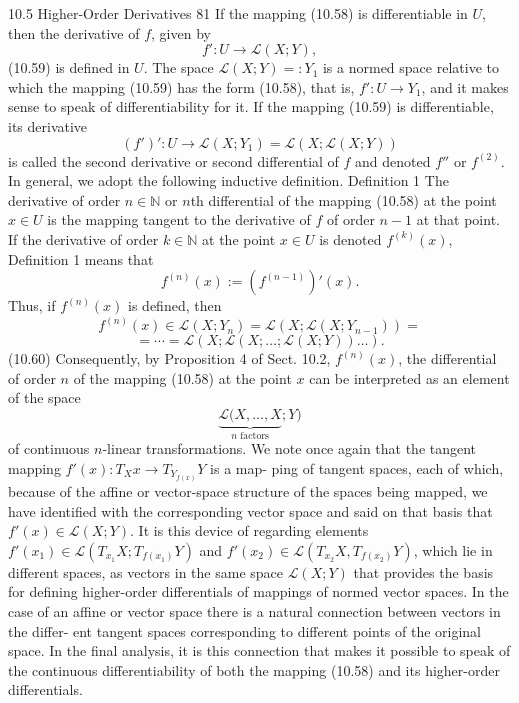 10.5 Higher-Order Derivatives
81
If the mapping (10.58) is differentiable in $U$, then the derivative of $f$, given by
$$f': U \to \mathcal{L}(X; Y),$$
(10.59)
is defined in $U$.
The space $\mathcal{L}(X; Y) =: Y_1$ is a normed space relative to which the mapping
(10.59) has the form (10.58), that is, $f' : U \to Y_1$, and it makes sense to speak
of differentiability for it.
If the mapping (10.59) is differentiable, its derivative
$$(f')' : U \to \mathcal{L}(X; Y_1) = \mathcal{L}(X; \mathcal{L}(X; Y))$$
is called the second derivative or second differential of $f$ and denoted $f''$ or $f^{(2)}$.
In general, we adopt the following inductive definition.
Definition 1 The derivative of order $n \in \mathbb{N}$ or $n$th differential of the mapping
(10.58) at the point $x \in U$ is the mapping tangent to the derivative of $f$ of order
$n-1$ at that point.
If the derivative of order $k \in \mathbb{N}$ at the point $x \in U$ is denoted $f^{(k)} (x)$, Definition 1
means that
$$f^{(n)} (x) := (f^{(n-1)})'(x).$$
Thus, if $f^{(n)} (x)$ is defined, then
$$f^{(n)}(x) \in \mathcal{L}(X; Y_n) = \mathcal{L}(X; \mathcal{L}(X; Y_{n-1})) =$$
$$= \cdots = \mathcal{L}(X; \mathcal{L}(X; \ldots; \mathcal{L}(X; Y)) \ldots).$$
(10.60)
Consequently, by Proposition 4 of Sect. 10.2, $f^{(n)} (x)$, the differential of order $n$ of
the mapping (10.58) at the point $x$ can be interpreted as an element of the space
$$\underbrace{\mathcal{L}(X, \ldots, X}_{n \text{ factors}}; Y)$$
of continuous $n$-linear transformations.
We note once again that the tangent mapping $f'(x) : T_Xx \to T_{Y_{f(x)}}Y$ is a map-
ping of tangent spaces, each of which, because of the affine or vector-space structure
of the spaces being mapped, we have identified with the corresponding vector space
and said on that basis that $f'(x) \in \mathcal{L}(X; Y)$. It is this device of regarding elements
$f'(x_1) \in \mathcal{L}(T_{x_1}X; T_{f(x_1)}Y)$ and $f'(x_2) \in \mathcal{L}(T_{x_2}X, T_{f(x_2)}Y)$, which lie in different
spaces, as vectors in the same space $\mathcal{L}(X; Y)$ that provides the basis for defining
higher-order differentials of mappings of normed vector spaces. In the case of an
affine or vector space there is a natural connection between vectors in the differ-
ent tangent spaces corresponding to different points of the original space. In the
final analysis, it is this connection that makes it possible to speak of the continuous
differentiability of both the mapping (10.58) and its higher-order differentials.